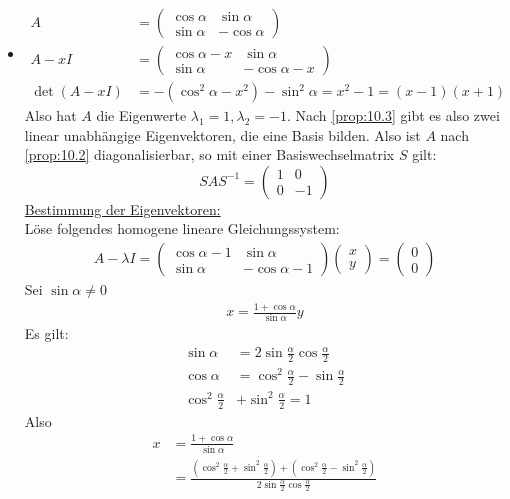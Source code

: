\documentclass{mycourse}
\begin{document}
\begin{ex}
\begin{itemize}
\item
\begin{align*}
A&=\begin{pmatrix}\cos\alpha & \sin \alpha\\\sin \alpha&-\cos\alpha\end{pmatrix}\\
A-xI&=\begin{pmatrix}\cos\alpha-x & \sin \alpha\\\sin \alpha&-\cos\alpha-x\end{pmatrix}\\
\det(A-xI)&=-(\cos^2\alpha - x^2)-\sin^2\alpha=x^2-1=(x-1)(x+1)
\end{align*}
Also hat $A$ die Eigenwerte $\lambda_1=1, \lambda_2=-1$.
Nach \ref{prop:10.3} gibt es also zwei linear unabhängige Eigenvektoren, die eine Basis bilden.
Also ist $A$ nach \ref{prop:10.2} diagonalisierbar, so mit einer Basiswechselmatrix $S$ gilt:
\[
SAS^{-1}=\begin{pmatrix}1&0\\0&-1\end{pmatrix}
\]
\underline{Bestimmung der Eigenvektoren:}\\
Löse folgendes homogene lineare Gleichungssystem:
\begin{align*}
A-\lambda I=\begin{pmatrix}\cos\alpha-1&\sin\alpha \\ \sin\alpha & -\cos\alpha -1\end{pmatrix}
\begin{pmatrix}x\\y\end{pmatrix}=
\begin{pmatrix}0\\0\end{pmatrix}
\end{align*}
Sei $\sin \alpha\neq 0$
\begin{align*}
x=\frac{1+\cos \alpha}{\sin \alpha}y
\end{align*}
Es gilt:
\begin{align*}
\sin\alpha &= 2\sin\frac{\alpha}2\cos\frac{\alpha}2\\
\cos\alpha &= \cos^2\frac\alpha2-\sin\frac\alpha2\\
\cos^2\frac\alpha2&+\sin^2\frac\alpha2=1
\end{align*}
Also
\begin{align*}
x&=\frac{1+\cos\alpha}{\sin\alpha}\\
&=\frac{(\cos^2\frac\alpha2+\sin^2\frac\alpha2)+(\cos^2\frac\alpha2-\sin^2\frac\alpha2)}{2\sin\frac\alpha2\cos\frac\alpha2}\\

\end{align*}
\end{itemize}
\end{ex}
\end{document}
